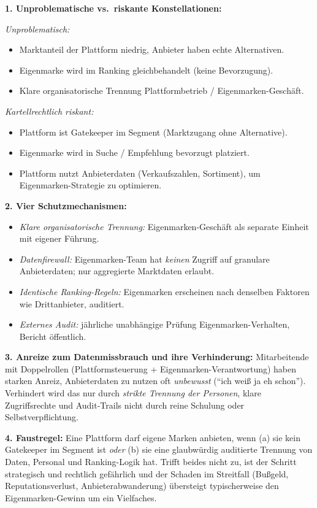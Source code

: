 \documentclass[11pt,a4paper,oneside]{article}
\begin{document}
\begin{loesungbox}
\textbf{1. Unproblematische vs.\ riskante Konstellationen:}

\smallskip
\emph{Unproblematisch:}
\begin{itemize}
  \item Marktanteil der Plattform niedrig, Anbieter haben echte Alternativen.
  \item Eigenmarke wird im Ranking gleichbehandelt (keine Bevorzugung).
  \item Klare organisatorische Trennung Plattformbetrieb / Eigenmarken-Geschäft.
\end{itemize}

\emph{Kartellrechtlich riskant:}
\begin{itemize}
  \item Plattform ist Gatekeeper im Segment (Marktzugang ohne Alternative).
  \item Eigenmarke wird in Suche / Empfehlung bevorzugt platziert.
  \item Plattform nutzt Anbieterdaten (Verkaufszahlen, Sortiment), um Eigenmarken-Strategie zu optimieren.
\end{itemize}

\textbf{2. Vier Schutzmechanismen:}
\begin{itemize}
  \item \emph{Klare organisatorische Trennung:} Eigenmarken-Geschäft als separate Einheit mit eigener Führung.
  \item \emph{Datenfirewall:} Eigenmarken-Team hat \emph{keinen} Zugriff auf granulare Anbieterdaten; nur aggregierte Marktdaten erlaubt.
  \item \emph{Identische Ranking-Regeln:} Eigenmarken erscheinen nach denselben Faktoren wie Drittanbieter, auditiert.
  \item \emph{Externes Audit:} jährliche unabhängige Prüfung Eigenmarken-Verhalten, Bericht öffentlich.
\end{itemize}

\textbf{3. Anreize zum Datenmissbrauch und ihre Verhinderung:}
Mitarbeitende mit Doppelrollen (Plattformsteuerung + Eigenmarken-Verantwortung) haben starken Anreiz, Anbieterdaten zu nutzen \textendash{} oft \emph{unbewusst} (``ich weiß ja eh schon''). Verhindert wird das nur durch \emph{strikte Trennung der Personen}, klare Zugriffsrechte und Audit-Trails \textendash{} nicht durch reine Schulung oder Selbstverpflichtung.

\smallskip
\textbf{4. Faustregel:}
Eine Plattform darf eigene Marken anbieten, wenn (a) sie kein Gatekeeper im Segment ist \emph{oder} (b) sie eine glaubwürdig auditierte Trennung von Daten, Personal und Ranking-Logik hat. Trifft beides nicht zu, ist der Schritt strategisch und rechtlich gefährlich \textendash{} und der Schaden im Streitfall (Bußgeld, Reputationsverlust, Anbieterabwanderung) übersteigt typischerweise den Eigenmarken-Gewinn um ein Vielfaches.
\end{loesungbox}
\end{document}

